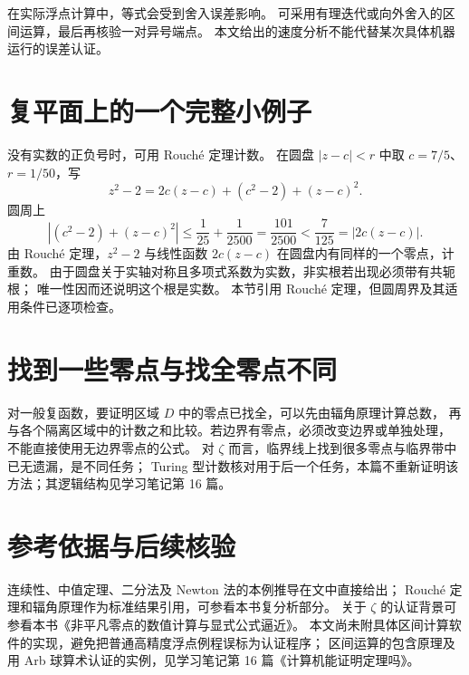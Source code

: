 \documentclass[UTF8,fontset=fandol,11pt]{ctexart}
\begin{document}
在实际浮点计算中，等式会受到舍入误差影响。
可采用有理迭代或向外舍入的区间运算，最后再核验一对异号端点。
本文给出的速度分析不能代替某次具体机器运行的误差认证。

\section{复平面上的一个完整小例子}
没有实数的正负号时，可用 Rouché 定理计数。
在圆盘 $|z-c|<r$ 中取 $c=7/5$、$r=1/50$，写
\[
 z^2-2=2c(z-c)+(c^2-2)+(z-c)^2.
\]
圆周上
\[
 |(c^2-2)+(z-c)^2|
 \le\frac1{25}+\frac1{2500}
 =\frac{101}{2500}
 <\frac7{125}=|2c(z-c)|.
\]
由 Rouché 定理，$z^2-2$ 与线性函数 $2c(z-c)$ 在圆盘内有同样的一个零点，计重数。
由于圆盘关于实轴对称且多项式系数为实数，非实根若出现必须带有共轭根；
唯一性因而还说明这个根是实数。
本节引用 Rouché 定理，但圆周界及其适用条件已逐项检查。

\section{找到一些零点与找全零点不同}
对一般复函数，要证明区域 $D$ 中的零点已找全，可以先由辐角原理计算总数，
再与各个隔离区域中的计数之和比较。若边界有零点，必须改变边界或单独处理，
不能直接使用无边界零点的公式。
对 $\zeta$ 而言，临界线上找到很多零点与临界带中已无遗漏，是不同任务；
Turing 型计数核对用于后一个任务，本篇不重新证明该方法；其逻辑结构见学习笔记第 16 篇。

\section*{参考依据与后续核验}
连续性、中值定理、二分法及 Newton 法的本例推导在文中直接给出；
Rouché 定理和辐角原理作为标准结果引用，可参看本书复分析部分。
关于 $\zeta$ 的认证背景可参看本书《非平凡零点的数值计算与显式公式逼近》。
本文尚未附具体区间计算软件的实现，避免把普通高精度浮点例程误标为认证程序；
区间运算的包含原理及用 Arb 球算术认证的实例，见学习笔记第 16 篇《计算机能证明定理吗》。
\end{document}
